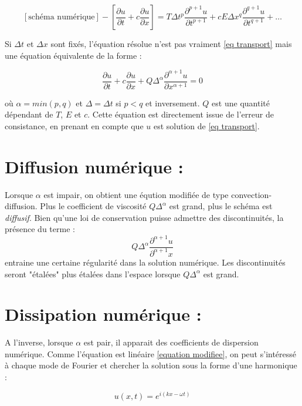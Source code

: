 \documentclass[10pt,a4paper]{amsart}
\begin{document}
$$\left[ \text{schéma numérique} \right] - \left[ \dfrac{\partial u}{\partial t} + c \dfrac{\partial u}{\partial x} \right] = T \Delta t^p \dfrac{\partial^{p+1} u}{\partial t^{p+1}} + c E \Delta x^q \dfrac{\partial^{q+1} u}{\partial t^{q+1}} + \ldots$$

Si $\Delta t$ et $\Delta x$ sont fixés, l'équation résolue n'est pas vraiment \eqref{eq transport} mais une équation équivalente de la forme :

\begin{equation}\label{equation modifiee}
\dfrac{\partial u}{\partial t} + c \dfrac{\partial u}{\partial x} + Q \Delta^\alpha \dfrac{\partial^{\alpha + 1} u}{\partial x^{\alpha + 1}}= 0 
\end{equation}

où $\alpha = min(p,q)$ et $\Delta = \Delta t$ si $p<q$ et inversement. $Q$ est une quantité dépendant de $T$, $E$ et $c$. Cette équation est directement issue de l'erreur de consistance, en prenant en compte que $u$ est solution de \eqref{eq transport}.
\newline


\section{Diffusion numérique : }

Lorsque $\alpha$ est impair, on obtient une éqution modifiée de type convection-diffusion. Plus le coefficient de viscosité $Q \Delta^{\alpha}$ est grand, plus le schéma est \textit{diffusif}. Bien qu'une loi de conservation puisse admettre des discontinuités, la présence du terme :
$$Q \Delta^\alpha \dfrac{\partial^{\alpha + 1} u}{\partial^{\alpha + 1} x}$$
 entraine une certaine régularité dans la solution numérique. Les discontinuités seront "étalées" plus étalées dans l'espace lorsque $Q \Delta^{\alpha}$ est grand.
\newline


\section{Dissipation numérique : }

A l'inverse, lorsque $\alpha$ est pair, il apparait des coefficients de dispersion numérique. Comme l'équation est linéaire \eqref{equation modifiee}, on peut s'intéressé à chaque mode de Fourier et chercher la solution sous la forme d'une harmonique :

$$u(x,t)= e^{i(kx - \omega t)}$$
\end{document}
